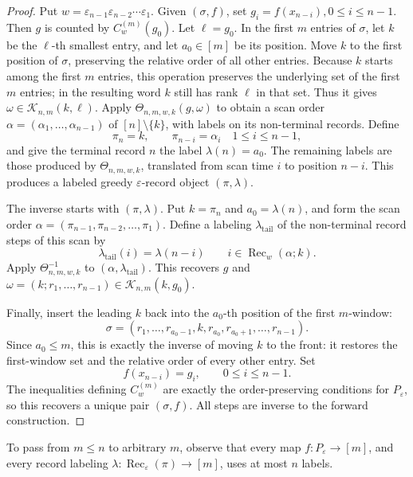 \documentclass[11pt,letterpaper,reqno]{amsart}
\theoremstyle{definition}
\newcommand{\eps}{\varepsilon}
\begin{document}
\begin{proof}
Put $w=\eps_{n-1}\eps_{n-2}\cdots\eps_1$. Given \((\sigma,f)\), set $g_i=f(x_{n-i}), 0\le i\le n-1$. Then \(g\) is counted by \(C_w^{(m)}(g_0)\).  Let \(\ell=g_0\).  In the first
\(m\) entries of \(\sigma\), let \(k\) be the \(\ell\)-th smallest entry, and
let \(a_0\in[m]\) be its position.  Move \(k\) to the first position of
\(\sigma\), preserving the relative order of all other entries.  Because \(k\)
starts among the first \(m\) entries, this operation preserves the underlying
set of the first \(m\) entries; in the resulting word \(k\) still has rank
\(\ell\) in that set.  Thus it gives $\omega\in\mathcal K_{n,m}(k,\ell)$. Apply $\Theta_{n,m,w,k}(g,\omega)$ to obtain a scan order $\alpha=(\alpha_1,\ldots,\alpha_{n-1})$
of \([n]\setminus\{k\}\), with labels on its non-terminal records.  Define
\[
\pi_n=k,\qquad
\pi_{n-i}=\alpha_i\quad1\le i\le n-1,
\]
and give the terminal record \(n\) the label $\lambda(n)=a_0$.
The remaining labels are those produced by \(\Theta_{n,m,w,k}\), translated
from scan time \(i\) to position \(n-i\).  This produces a labeled greedy
\(\eps\)-record object \((\pi,\lambda)\).

The inverse starts with \((\pi,\lambda)\).  Put \(k=\pi_n\) and
\(a_0=\lambda(n)\), and form the scan order $\alpha=(\pi_{n-1},\pi_{n-2},\ldots,\pi_1)$. Define a labeling \(\lambda_{\mathrm{tail}}\) of the non-terminal record steps
of this scan by
\[
\lambda_{\mathrm{tail}}(i)=\lambda(n-i)
\qquad
i\in \operatorname{Rec}_w(\alpha;k).
\]
Apply \(\Theta_{n,m,w,k}^{-1}\) to
\((\alpha,\lambda_{\mathrm{tail}})\).  This recovers \(g\) and $\omega=(k;r_1,\ldots,r_{n-1})\in\mathcal K_{n,m}(k,g_0)$.

Finally, insert the leading \(k\) back into the \(a_0\)-th position of the
first \(m\)-window:
\[
\sigma=(r_1,\ldots,r_{a_0-1},k,r_{a_0},r_{a_0+1},\ldots,r_{n-1}).
\]
Since \(a_0\le m\), this is exactly the inverse of moving \(k\) to the front:
it restores the first-window set and the relative order of every other entry.
Set
\[
f(x_{n-i})=g_i,\qquad 0\le i\le n-1.
\]
The inequalities defining \(C_w^{(m)}\) are exactly the order-preserving
conditions for \(P_\eps\), so this recovers a unique pair \((\sigma,f)\).
All steps are inverse to the forward construction.
\end{proof}

To pass from \(m\le n\) to arbitrary \(m\), observe that every map
\(f:P_\eps\to[m]\), and every record labeling
\(\lambda:\operatorname{Rec}_\eps(\pi)\to[m]\), uses at most \(n\) labels.
\end{document}
